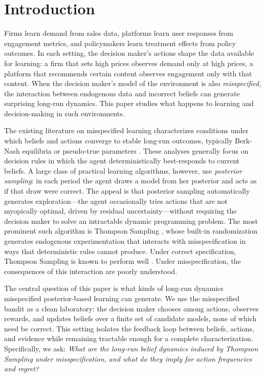 \documentclass[12pt]{article}
\begin{document}
\newpage
\restoregeometry

\section{Introduction}
Firms learn demand from sales data, platforms learn user responses from engagement metrics, and policymakers learn treatment effects from policy outcomes. In each setting, the decision maker’s actions shape the data available for learning: a firm that sets high prices observes demand only at high prices, a platform that recommends certain content observes engagement only with that content. When the decision maker’s model of the environment is also \emph{misspecified}, the interaction between endogenous data and incorrect beliefs can generate surprising long-run dynamics. This paper studies what happens to learning and decision-making in such environments.

The existing literature on misspecified learning characterizes conditions under which beliefs and actions converge to stable long-run outcomes, typically Berk-Nash equilibria or pseudo-true parameters \citep{espondaBerkNashEquilibrium2016,fudenbergLimitPointsEndogenous2021a}. These analyses generally focus on decision rules in which the agent deterministically best-responds to current beliefs. A large class of practical learning algorithms, however, use \emph{posterior sampling}: in each period the agent draws a model from her posterior and acts as if that draw were correct. The appeal is that posterior sampling automatically generates exploration---the agent occasionally tries actions that are not myopically optimal, driven by residual uncertainty---without requiring the decision maker to solve an intractable dynamic programming problem. The most prominent such algorithm is Thompson Sampling \citep{thompsonLikelihoodThatOne1933,russoTutorialThompsonSampling2020}, whose built-in randomization generates endogenous experimentation that interacts with misspecification in ways that deterministic rules cannot produce. Under correct specification, Thompson Sampling is known to perform well \citep{agrawalAnalysisThompsonSampling2012,kaufmannThompsonSamplingAsymptotically2012}. Under misspecification, the consequences of this interaction are poorly understood.

The central question of this paper is what kinds of long-run dynamics misspecified posterior-based learning can generate. We use the misspecified bandit as a clean laboratory: the decision maker chooses among actions, observes rewards, and updates beliefs over a finite set of candidate models, none of which need be correct. This setting isolates the feedback loop between beliefs, actions, and evidence while remaining tractable enough for a complete characterization. Specifically, we ask: \emph{What are the long-run belief dynamics induced by Thompson Sampling under misspecification, and what do they imply for action frequencies and regret?}
\end{document}

